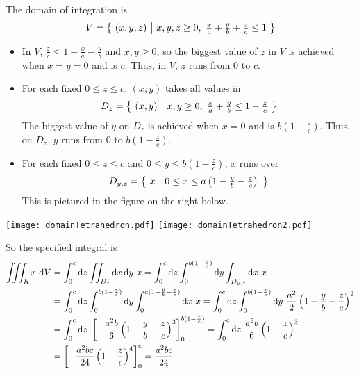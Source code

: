 \begin{solution}
The domain of integration is  
\begin{equation*}
V=\Set{(x,y,z)}{x,y,z\ge 0,\ \tfrac{x}{a}+\tfrac{y}{b}+\tfrac{z}{c}\le 1}
\end{equation*}
\begin{itemize}
\item
In $V$, $\tfrac{z}{c}\le 1-\tfrac{x}{a}-\tfrac{y}{b}$ and $x,y\ge0$, so
the biggest value of $z$ in $V$ is achieved when $x=y=0$ and is $c$. 
Thus, in $V$, $z$ runs from $0$ to $c$.
\item
For each fixed $0\le z\le c$, $(x,y)$ takes all values in
\begin{equation*}
D_z=\big\{ \ (x,y)\ \big|\ x,y\ge 0,\ \tfrac{x}{a}+\tfrac{y}{b}\le 1-\tfrac{z}{c}\ \big\}
\end{equation*}
The biggest value of $y$ on $D_z$ is achieved when $x=0$ and is $b\left(1-\tfrac{z}{c}\right)$. Thus, on $D_z$, $y$ runs from $0$ to 
$b\left(1-\tfrac{z}{c}\right)$.
\item
For each fixed $0\le z\le c$ and
 $0\le y \le b\left(1-\tfrac{z}{c}\right)$, $x$ runs over
\begin{equation*}
D_{y,z}=\big\{ \ x\ \big|\ 0\le x \le a\left(1-\tfrac{y}{b}-\tfrac{z}{c}\right)\ \big\}
\end{equation*}
This is pictured in the figure on the right below.
\end{itemize}

\begin{center}
     \texttt{[image: domainTetrahedron.pdf]}\qquad
     \texttt{[image: domainTetrahedron2.pdf]}
\end{center} 

So the specified integral is
\begin{align*}
\tripInt_R x\ \dee{V}
&=\int_0^c \dee{z} \dblInt_{D_z} \dee{x}\,\dee{y}\ x
 = \int_0^c \dee{z}\int_0^{b(1-{z\over c})}\dee{y}\int_{D_{y,z}}\dee{x}\ x\\
&=\int_0^c \dee{z}\int_0^{b(1-{z\over c})}\dee{y}
             \int_0^{a(1-{y\over b}-{z\over c})} \dee{x}\ x
=\int_0^c \dee{z}\int_0^{b(1-{z\over c})} \dee{y}\ \frac{a^2}{2}
\left(1-\frac{y}{b}-\frac{z}{c}\right)^2 \\
&=\int_0^c \dee{z}\ \left[-\frac{a^2b}{6}
           \left(1-\frac{y}{b}-\frac{z}{c}\right)^3
                                    \right]_0^{b(1-{z\over c})}
=\int_0^c \dee{z}\ \frac{a^2b}{6}\left(1-\frac{z}{c}\right)^3 \\
&=\left[-\frac{a^2bc}{24}\left(1-\frac{z}{c}\right)^4  \right]_0^c
=\frac{a^2bc}{24}
\end{align*}
\end{solution}

